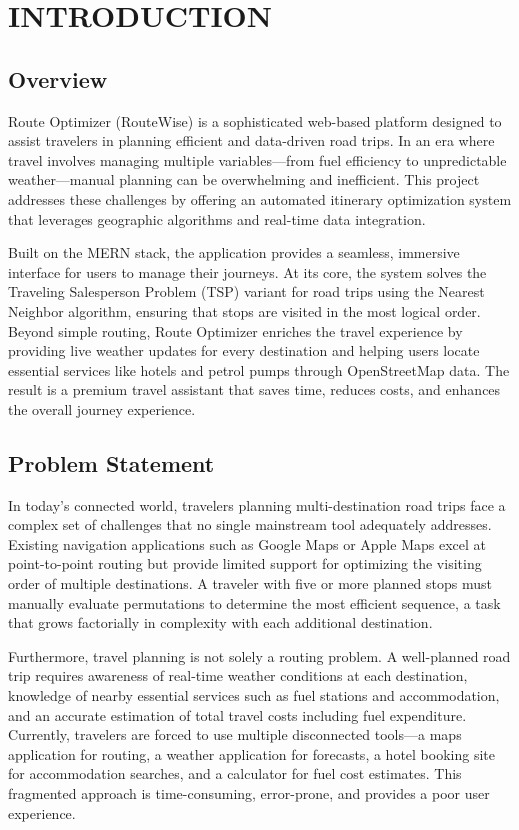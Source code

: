 \chapter{INTRODUCTION}

\section{Overview}
Route Optimizer (RouteWise) is a sophisticated web-based platform designed to assist travelers in planning efficient and data-driven road trips. In an era where travel involves managing multiple variables---from fuel efficiency to unpredictable weather---manual planning can be overwhelming and inefficient. This project addresses these challenges by offering an automated itinerary optimization system that leverages geographic algorithms and real-time data integration.

Built on the MERN stack, the application provides a seamless, immersive interface for users to manage their journeys. At its core, the system solves the Traveling Salesperson Problem (TSP) variant for road trips using the Nearest Neighbor algorithm, ensuring that stops are visited in the most logical order. Beyond simple routing, Route Optimizer enriches the travel experience by providing live weather updates for every destination and helping users locate essential services like hotels and petrol pumps through OpenStreetMap data. The result is a premium travel assistant that saves time, reduces costs, and enhances the overall journey experience.

\section{Problem Statement}
In today's connected world, travelers planning multi-destination road trips face a complex set of challenges that no single mainstream tool adequately addresses. Existing navigation applications such as Google Maps or Apple Maps excel at point-to-point routing but provide limited support for optimizing the visiting order of multiple destinations. A traveler with five or more planned stops must manually evaluate permutations to determine the most efficient sequence, a task that grows factorially in complexity with each additional destination.

Furthermore, travel planning is not solely a routing problem. A well-planned road trip requires awareness of real-time weather conditions at each destination, knowledge of nearby essential services such as fuel stations and accommodation, and an accurate estimation of total travel costs including fuel expenditure. Currently, travelers are forced to use multiple disconnected tools---a maps application for routing, a weather application for forecasts, a hotel booking site for accommodation searches, and a calculator for fuel cost estimates. This fragmented approach is time-consuming, error-prone, and provides a poor user experience.

